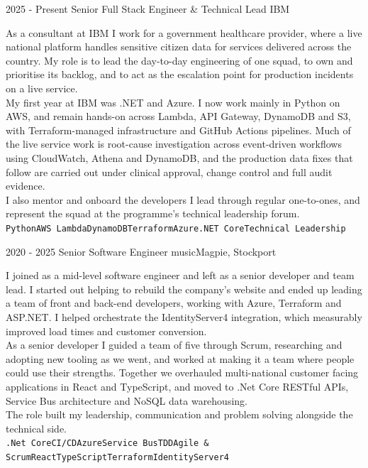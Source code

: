 \documentclass[8pt]{developercv} %
\begin{document}
\begin{entrylist}
    \entry
		{}
		{}
		{}
		{\vspace{-0.5cm}}

\vspace{0.6cm}
    \entry
		{2025 - Present}
		{Senior Full Stack Engineer \& Technical Lead}
		{IBM}
		{\raggedright As a consultant at IBM I work for a government healthcare provider, where a live national platform handles sensitive citizen data for services delivered across the country. My role is to lead the day-to-day engineering of one squad, to own and prioritise its backlog, and to act as the escalation point for production incidents on a live service.\\\vspace{0.1cm}My first year at IBM was .NET and Azure. I now work mainly in Python on AWS, and remain hands-on across Lambda, API Gateway, DynamoDB and S3, with Terraform-managed infrastructure and GitHub Actions pipelines. Much of the live service work is root-cause investigation across event-driven workflows using CloudWatch, Athena and DynamoDB, and the production data fixes that follow are carried out under clinical approval, change control and full audit evidence.\\\vspace{0.1cm}I also mentor and onboard the developers I lead through regular one-to-ones, and represent the squad at the programme's technical leadership forum.\\\vspace{0.1cm}\texttt{Python}\slashsep\texttt{AWS Lambda}\slashsep\texttt{DynamoDB}\slashsep\texttt{Terraform}\slashsep\texttt{Azure}\slashsep\texttt{.NET Core}\slashsep\texttt{Technical Leadership}}

\vspace{0.6cm}
    \entry
		{2020 - 2025}
		{Senior Software Engineer}
		{musicMagpie, Stockport}
		{\raggedright I joined as a mid-level software engineer and left as a senior developer and team lead. I started out helping to rebuild the company's website and ended up leading a team of front and back-end developers, working with Azure, Terraform and ASP.NET. I helped orchestrate the IdentityServer4 integration, which measurably improved load times and customer conversion.\\\vspace{0.1cm}As a senior developer I guided a team of five through Scrum, researching and adopting new tooling as we went, and worked at making it a team where people could use their strengths. Together we overhauled multi-national customer facing applications in React and TypeScript, and moved to .Net Core RESTful APIs, Service Bus architecture and NoSQL data warehousing.\\\vspace{0.1cm}The role built my leadership, communication and problem solving alongside the technical side.\\\vspace{0.1cm}\texttt{.Net Core}\slashsep\texttt{CI/CD}\slashsep\texttt{Azure}\slashsep\texttt{Service Bus}\slashsep\texttt{TDD}\slashsep\texttt{Agile \& Scrum}\slashsep\texttt{React}\slashsep\texttt{TypeScript}\slashsep\texttt{Terraform}\slashsep\texttt{IdentityServer4}}


\end{entrylist}
\end{document}
